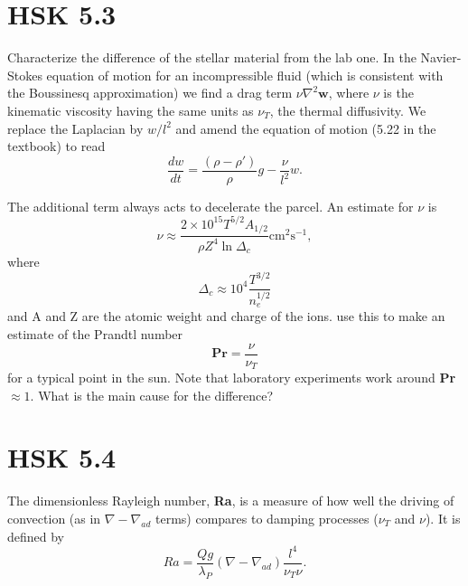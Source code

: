 \section{HSK 5.3}
Characterize the difference of the stellar material from the lab one.
In the Navier-Stokes equation of motion for an incompressible 
fluid (which is consistent with the Boussinesq approximation) we find a drag term $\nu\nabla^2\boldsymbol{w}$, where $\nu$ is the kinematic viscosity having the same units as $\nu_T$, the thermal diffusivity. We replace the Laplacian by $w/l^2$ and amend the equation of motion (5.22 in the textbook) to read
\begin{equation*}
    \frac{dw}{dt}=\frac{(\rho-\rho')}{\rho}g-\frac{\nu}{l^2}w.
\end{equation*}

The additional term always acts to decelerate the parcel. An estimate for $\nu$ is
\begin{equation*}
    \nu \approx \frac{2\times 10^15 T^{5/2}A_{1/2}}{\rho Z^4\ln\Delta_c}\text{cm}^2\text{s}^{-1},
\end{equation*}
where
\begin{equation*}
    \Delta_c \approx 10^4\frac{T^{3/2}}{n_e^{1/2}}
\end{equation*}
and A and Z are the atomic weight and charge of the ions. use this to make an estimate of the Prandtl number
\begin{equation*}
    \boldsymbol{Pr}=\frac{\nu}{\nu_T}
\end{equation*}
for a typical point in the sun. Note that laboratory experiments work around \textbf{Pr}$\approx 1$. What is the main cause for the difference?



\section{HSK 5.4}
The dimensionless Rayleigh number, \textbf{Ra}, is a measure of how well the driving of convection (as in $\nabla-\nabla_{ad}$ terms) compares to damping processes ($\nu_T$ and $\nu$). It is defined by 
\begin{equation*}
    Ra = \frac{Qg}{\lambda_P}(\nabla-\nabla_{ad})\frac{l^4}{\nu_T\nu}.
\end{equation*}

